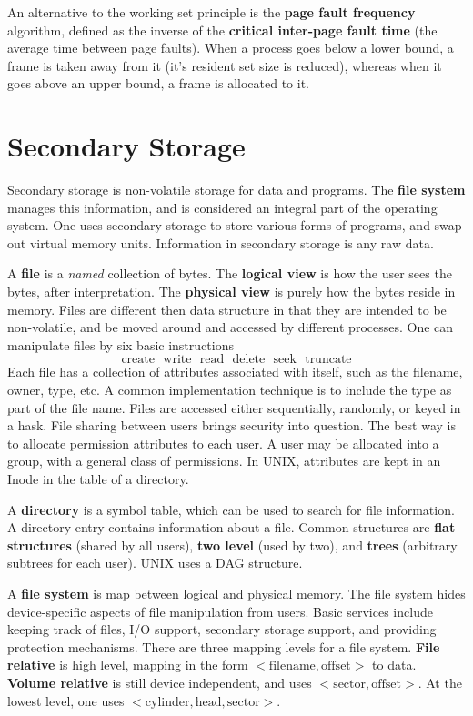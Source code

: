 An alternative to the working set principle is the {\bf page fault frequency} algorithm, defined as the inverse of the {\bf critical inter-page fault time} (the average time between page faults). When a process goes below a lower bound, a frame is taken away from it (it's resident set size is reduced), whereas when it goes above an upper bound, a frame is allocated to it.

\section{Secondary Storage}

Secondary storage is non-volatile storage for data and programs. The {\bf file system} manages this information, and is considered an integral part of the operating system. One uses secondary storage to store various forms of programs, and swap out virtual memory units. Information in secondary storage is any raw data.

A {\bf file} is a {\it named} collection of bytes. The {\bf logical view} is how the user sees the bytes, after interpretation. The {\bf physical view} is purely how the bytes reside in memory. Files are different then data structure in that they are intended to be non-volatile, and be moved around and accessed by different processes. One can manipulate files by six basic instructions
%
\[ \text{create}\ \ \ \text{write}\ \ \ \text{read}\ \ \ \text{delete}\ \ \ \text{seek}\ \ \ \text{truncate} \]
%
Each file has a collection of attributes associated with itself, such as the filename, owner, type, etc. A common implementation technique is to include the type as part of the file name. Files are accessed either sequentially, randomly, or keyed in a hask. File sharing between users brings security into question. The best way is to allocate permission attributes to each user. A user may be allocated into a group, with a general class of permissions. In UNIX, attributes are kept in an Inode in the table of a directory.

A {\bf directory} is a symbol table, which can be used to search for file information. A directory entry contains information about a file. Common structures are {\bf flat structures} (shared by all users), {\bf two level} (used by two), and {\bf trees} (arbitrary subtrees for each user). UNIX uses a DAG structure.

A {\bf file system} is map between logical and physical memory. The file system hides device-specific aspects of file manipulation from users. Basic services include keeping track of files, I/O support, secondary storage support, and providing protection mechanisms. There are three mapping levels for a file system. {\bf File relative} is high level, mapping in the form $<\text{filename}, \text{offset}>$ to data. {\bf Volume relative} is still device independent, and uses $<\text{sector}, \text{offset}>$. At the lowest level, one uses $<\text{cylinder}, \text{head}, \text{sector}>$.

